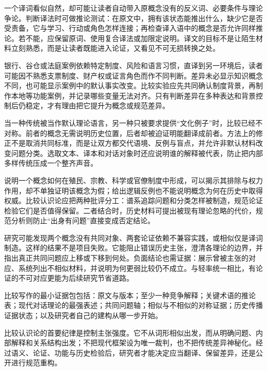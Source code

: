 一个译词看似自然，却可能让读者自动带入原概念没有的反义词、必要条件与理论争论。判断译法时可做推论测试：在原文中，拥有该状态能推出什么，缺少它是否受责备，它与学习、行动或角色怎样连接；再检查译入语中的概念是否允许同样推论。若不能，应保留原词、使用复合译法或加限定说明。译文的目标不是让陌生材料立刻熟悉，而是让读者既能进入论证，又看见不可无损转换之处。

银行、谷仓或法庭案例依赖特定制度、风险和语言习惯，直译到另一环境后，读者可能因不熟悉支票制度、财产权或证言角色而作不同判断。差异未必显示知识概念不同，也可能显示案例中的默认事实改变。比较实验应先共同确认制度背景，再制作本地等功能案例，并记录哪些变量无法对齐。只有判断差异在多种表达和背景控制后仍稳定，才有理由把它提升为概念或规范差异。

当一种传统被当作默认理论语言，另一种只被要求提供“文化例子”时，比较已经不对称。前者的概念无需说明历史位置，后者却被迫证明能翻译成前者。方法上的修正不是取消共同标准，而是让双方都交代语境、反例与盲点，并允许非默认材料改变问题分类。选取文本、译本和对话对象时还应说明谁的解释被代表，防止把内部多样传统压成一个整齐声音。

说明一个概念如何在殖民、宗教、科学或官僚制度中形成，可以揭示其排除与权力作用，却不单独证明该概念为假；给出逻辑反例也不能说明概念为何在历史中取得权威。比较认识论应把两种批评分工：谱系追踪问题和分类怎样被制造，规范论证检验它们是否值得保留。二者结合时，历史材料可提出被现有理论忽略的代价，规范分析则防止“出身有问题”直接变成否定结论。

研究可能发现两个概念没有共同对象、两套论证依赖不兼容实践，或相似仅是译词制造。这样的结果不是项目失败。它能阻止错误历史主张，澄清各理论的边界，并指出真正共同问题应上移或下移到何处。负面结论也需证据：展示曾被主张的对应、系统列出不相似材料，并说明为何更弱比较仍不成立。与轻率统一相比，有论证的不可对应更能为后续研究节省道路。

\begin{argumentbox}
比较写作的最小证据包包括：原文与版本；至少一种竞争解释；关键术语的推论表；现代对话理论的最强表述；共同问题轴；相似与不相似的对称证据；历史传播证据状态；以及研究者自己的建构从哪一步开始。
\end{argumentbox}

比较认识论的首要纪律是控制主张强度。它不从词形相似出发，而从明确问题、内部解释和关系结构出发；不把现代框架设为唯一裁判，也不把传统差异神秘化。经过语义、论证、功能与历史检验后，研究者才能决定应当翻译、保留差异，还是公开进行规范重构。
